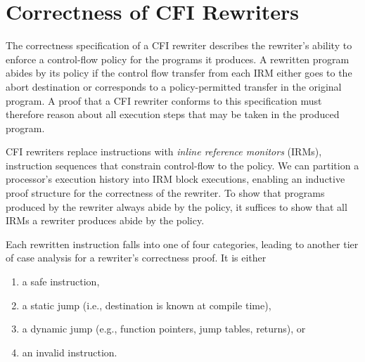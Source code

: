 
\section{Correctness of CFI Rewriters}\label{sec:proof_structure}


The correctness specification of a CFI rewriter describes the rewriter's ability to enforce a control-flow policy for the programs it produces.
A rewritten program abides by its policy if the control flow transfer from each IRM either goes to the abort destination or corresponds to a policy-permitted transfer in the original program.
A proof that a CFI rewriter conforms to this specification must therefore reason about all execution steps that may be taken in the produced program.

CFI rewriters replace instructions  with \emph{inline reference monitors} (IRMs), instruction sequences that constrain control-flow to the policy.
We can partition a processor's execution history into IRM block executions, enabling an inductive proof structure for the correctness of the rewriter.
To show that programs produced by the rewriter always abide by the policy, it suffices to show that all IRMs a rewriter produces abide by the policy.

Each rewritten instruction falls into one of four categories, leading to another tier of case analysis for a rewriter's correctness proof.
It is either
\begin{enumerate}
    \item a safe instruction,
    \item a static jump (i.e., destination is known at compile time),
    \item a dynamic jump (e.g., function pointers, jump tables, returns), or
    \item an invalid instruction.
\end{enumerate}


